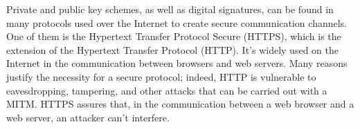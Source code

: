 Private and public key schemes, as well as digital signatures, can be found in many protocols used over the Internet to create secure communication channels. One of them is the Hypertext Transfer Protocol Secure (HTTPS), which is the extension of the Hypertext Transfer Protocol (HTTP). It's widely used on the Internet in the communication between browsers and web servers. Many reasons justify the necessity for a secure protocol; indeed, HTTP is vulnerable to eavesdropping, tampering, and other attacks that can be carried out with a MITM. HTTPS assures that, in the communication between a web browser and a web server, an attacker can't interfere.
